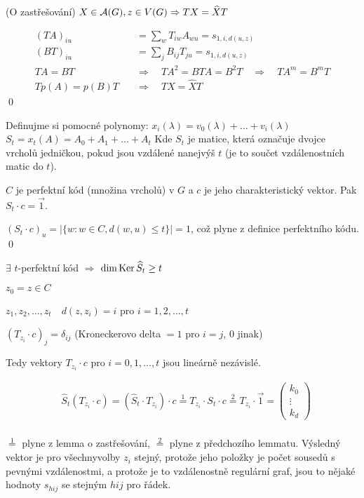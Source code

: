 \lm (O zastřešování) $X\in\mathcal{A}(G), z\in V(G) \Rightarrow TX = \widehat XT$

\dk 
\begin{align*}
(TA)_{iu} &= \sum_w T_{iw}A_{wu} = s_{1,i,d(u,z)} \\
(BT)_{iu} &= \sum_j B_{ij}T_{ju} = s_{1,i,d(u,z)} \\
TA = BT \quad&\Rightarrow\quad TA^2 = BTA = B^2T \quad\Rightarrow\quad TA^m = B^mT \\
Tp(A) = p(B)T \quad&\Rightarrow\quad TX = \widehat XT
\end{align*}
\qed

\df Definujme si pomocné polynomy: 
	$x_i(\lambda) = v_0(\lambda) + \dots + v_i(\lambda)$ \hfil $S_t = x_t(A) = A_0 + A_1 + \dots + A_t$
Kde $S_t$ je matice, která označuje dvojce vrcholů jedničkou, pokud jsou vzdálené nanejvýš $t$ (je to součet vzdálenostních matic do $t$).

\lm $C$ je perfektní kód (množina vrcholů) v $G$ a $c$ je jeho charakteristický vektor. Pak $S_t\cdot c = \vec 1$.

\dk $(S_t\cdot c)_u = |\{w: w\in C, d(w,u) \le t\}| = 1$, což plyne z definice perfektního kódu.
\qed

\lm $\exists$ $t$-perfektní kód $\Rightarrow$ $\dim \operatorname{Ker} \widehat S_t \ge t$

\dk $z_0 = z \in C$

$z_1,z_2,\dots,z_t \quad d(z,z_i) = i$ pro $i = 1,2,\dots,t$

$(T_{z_i} \cdot c)_j = \delta_{ij}$ (Kroneckerovo delta $= 1$ pro $i=j$, $0$ jinak)

Tedy vektory $T_{z_i} \cdot c$ pro $i = 0, 1, \dots, t$ jsou lineárně nezávislé.

\begin{align*}
	&\widehat S_t(T_{z_i}\cdot c) = (\widehat S_t \cdot T_{z_i}) \cdot c \overset{1}{=} T_{z_i} \cdot S_t \cdot c \overset{2}{=} T_{z_i}\cdot \vec 1 = \left(\begin{matrix}
		k_0 \\ \vdots \\ k_d
	\end{matrix}\right) \\
\end{align*}

$\overset{1}{=}$ plyne z lemma o zastřešování, $\overset{2}{=}$ plyne z předchozího lemmatu. Výsledný vektor je pro všechnyvolby $z_i$ stejný, protože jeho položky je počet sousedů s pevnými vzdálenostmi, a protože je to vzdálenostně regulární graf, jsou to nějaké hodnoty $s_{hij}$ se stejným $hij$ pro řádek.


